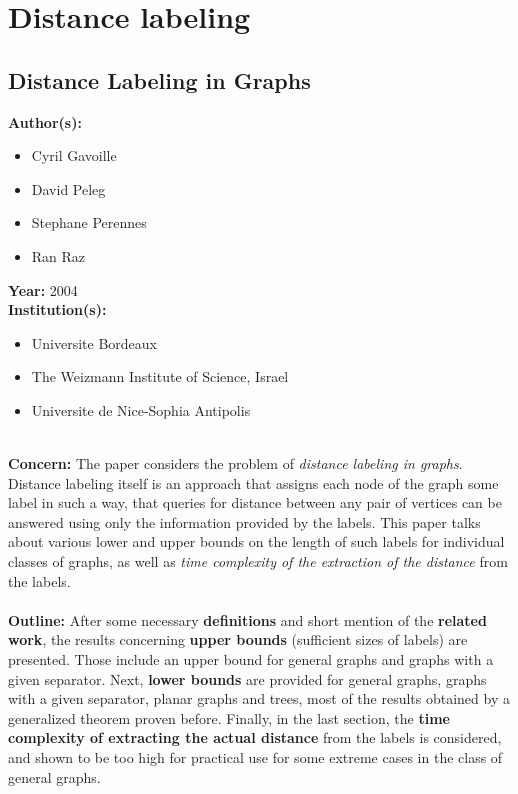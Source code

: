 \documentclass[a4paper]{article}
\newenvironment{itemizesp}
{
    \begin{itemize}
}
{
    \end{itemize}
}
\newcommand{\textbff}[1]{{\large \textbf{#1}}}
\begin{document}
    \pagebreak
    \section{Distance labeling}

        \subsection{Distance Labeling in Graphs}
        \label{subsec:distlabel}

        \textbff{Author(s): }
        \begin{itemizesp}
            \item Cyril Gavoille
            \item David Peleg
            \item Stephane Perennes
            \item Ran Raz
        \end{itemizesp}
        \textbff{Year: }2004 \\
        \textbff{Institution(s): }
        \begin{itemizesp}
            \item Universite Bordeaux
            \item The Weizmann Institute of Science, Israel
            \item Universite de Nice-Sophia Antipolis
        \end{itemizesp}
        {\hfill}\\
        \textbff{Concern:} The paper considers the problem of \emph{distance labeling in graphs}. Distance labeling itself is an approach that assigns each node of the graph some label in such a way, that queries for distance between any pair of vertices can be answered using only the information provided by the labels. This paper talks about various lower and upper bounds on the length of such labels for individual classes of graphs, as well as \emph{time complexity of the extraction of the distance} from the labels. \\
        {\hfill}\\
        \textbff{Outline:} After some necessary \textbf{definitions} and short mention of the \textbf{related work}, the results concerning \textbf{upper bounds} (sufficient sizes of labels) are presented. Those include an upper bound for general graphs and graphs with a given separator. Next, \textbf{lower bounds} are provided for general graphs, graphs with a given separator, planar graphs and trees, most of the results obtained by a generalized theorem proven before. Finally, in the last section, the \textbf{time complexity of extracting the actual distance} from the labels is considered, and shown to be too high for practical use for some extreme cases in the class of general graphs.\\
\end{document}
